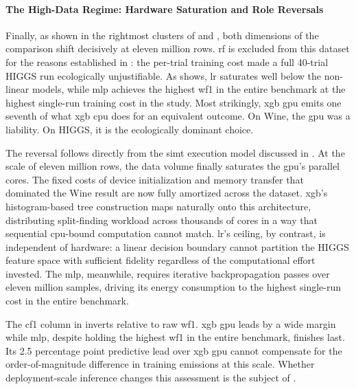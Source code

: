 \FloatBarrier
\paragraph{The High-Data Regime: Hardware Saturation and Role Reversals}
\label{sec:results_higgs}

Finally, as shown in the rightmost clusters of  and , both dimensions of the comparison shift decisively at eleven million rows. \gls{rf} is excluded from this dataset for the reasons established in : the per-trial training cost made a full 40-trial HIGGS run ecologically unjustifiable. As  shows, \gls{lr} saturates well below the non-linear models, while \gls{mlp} achieves the highest \gls{wf1} in the entire benchmark at the highest single-run training cost in the study. Most strikingly, \gls{xgb} \gls{gpu} emits one seventh of what \gls{xgb} \gls{cpu} does for an equivalent outcome. On Wine, the \gls{gpu} was a liability. On HIGGS, it is the ecologically dominant choice.

The reversal follows directly from the \gls{simt} execution model discussed in . At the scale of eleven million rows, the data volume finally saturates the \gls{gpu}'s parallel cores. The fixed costs of device initialization and memory transfer that dominated the Wine result are now fully amortized across the dataset. \gls{xgb}'s histogram-based tree construction maps naturally onto this architecture, distributing split-finding workload across thousands of cores in a way that sequential \gls{cpu}-bound computation cannot match. \gls{lr}'s ceiling, by contrast, is independent of hardware: a linear decision boundary cannot partition the HIGGS feature space with sufficient fidelity regardless of the computational effort invested. The \gls{mlp}, meanwhile, requires iterative backpropagation passes over eleven million samples, driving its energy consumption to the highest single-run cost in the entire benchmark.

The \gls{cf1} column in  inverts relative to raw \gls{wf1}. \gls{xgb} \gls{gpu} leads by a wide margin while \gls{mlp}, despite holding the highest \gls{wf1} in the entire benchmark, finishes last. Its 2.5 percentage point predictive lead over \gls{xgb} \gls{gpu} cannot compensate for the order-of-magnitude difference in training emissions at this scale. Whether deployment-scale inference changes this assessment is the subject of .

